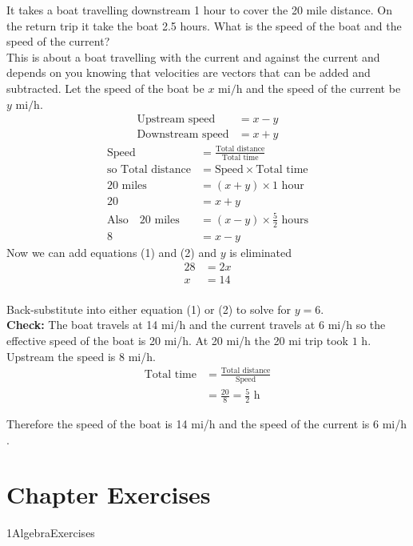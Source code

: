  \example It takes a boat travelling downstream 1 hour to cover the 20 mile distance. On the return trip it take the boat 2.5 hours. What is the speed of the boat and the speed of the current?\medskip\\
 \solution This is about a boat travelling with the current and against the current and depends on you knowing that velocities are vectors that can be added and subtracted. Let the speed of the boat be $x$ \mbox{mi}$/$\mbox{h} and the speed of the current be $y$ \mbox{mi}$/$\mbox{h}. 
 	\begin{align*}\text{Upstream speed} &  =  x -y \\
 	\text{Downstream speed} &  =  x +y\end{align*}
 	\begin{align}\text{Speed} &  =  \frac{\text{Total distance}}{\text{Total time}} \nonumber  \\
 	\text{so Total distance} &  =  \text{Speed} \times \text{Total time} \nonumber  \\
 	20 \textrm{ miles } &  =  \left (x +y\right ) \times 1 \textrm{ hour} \nonumber  \\
 	20 &=x +y \tag{1} \\
 	\text{Also}\quad 20 \textrm{ miles }&  =  \left (x -y\right ) \times \frac{5}{2} \textrm{ hours}\nonumber  \\
 	8 &=x -y \tag{2}\end{align}
 Now we can add equations (1) and (2) and $y$ is eliminated
 \begin{align*}28 &  =  2 x \\
 x &  =  14\end{align*} \\
 Back-substitute into either equation (1) or (2) to solve for $y =  6$.\medskip\\
 \textbf{Check:} The boat travels at 14 $\mbox{mi}$/$\mbox{h}$ and the current travels at 6 $\mbox{mi}$/$\mbox{h}$ so the effective speed of the boat is 20 $\mbox{mi}$/$\mbox{h}$. At 20 $\mbox{mi}$/$\mbox{h}$ the 20 $\mbox{mi}$ trip took $1$ $\mbox{h}$. Upstream the speed is 8 $\mbox{mi}$/$\mbox{h}$.
 \begin{align*}\text{Total time} &  =  \frac{\text{Total distance}}{\text{Speed}} \\
 &  =  \frac{20}{8} =\frac{5}{2} \text{ h}\end{align*}
 
 Therefore the speed of the boat is 14 $\mbox{mi}$/$\mbox{h}$ and the speed of the current is 6 $\mbox{mi}$/$\mbox{h}$. 

\section{Chapter Exercises}
{1AlgebraExercises}
